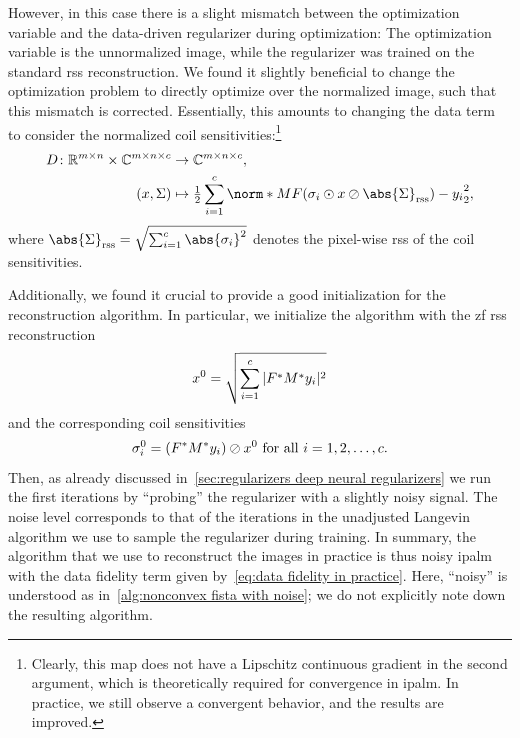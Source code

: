 However, in this case there is a slight mismatch between the optimization variable and the data-driven regularizer during optimization:
The optimization variable is the unnormalized image, while the regularizer was trained on the standard \gls{rss} reconstruction.
We found it slightly beneficial to change the optimization problem to directly optimize over the normalized image, such that this mismatch is corrected.
Essentially, this amounts to changing the data term to consider the normalized coil sensitivities:\footnote{%
	Clearly, this map does not have a Lipschitz continuous gradient in the second argument, which is theoretically required for convergence in \gls{ipalm}.
	In practice, we still observe a convergent behavior, and the results are improved.%
}
\begin{equation}
	\begin{aligned}
		\map{D}{\R^{m\times n}\times \C^{m\times n \times c}&}{\C^{m\times n \times c}},\\
		(x, \Sigma) &\mapsto \Half \sum_{i=\num{1}}^c \norm*{\Mask\Fourier(\sigma_i \odot x \oslash \abs{\Sigma}_{\mathrm{rss}}) - \Data_i}_{\num{2}}^{\num{2}},
	\end{aligned}
	\label{eq:data fidelity in practice}
\end{equation}
where \( \abs{\Sigma}_{\mathrm{rss}} = \sqrt{\sum_{i=\num{1}}^c \abs{\sigma_i}^{\num{2}}} \) denotes the pixel-wise \gls{rss} of the coil sensitivities.

Additionally, we found it crucial to provide a good initialization for the reconstruction algorithm.
In particular, we initialize the algorithm with the \gls{zf} \gls{rss} reconstruction
\begin{equation}
	x^{0} = \sqrt{\sum_{i=\num{1}}^c|F^{\ast}M^{\ast}y_i|^{\num{2}}}
	\label{eq:zero filled rss}
\end{equation}
and the corresponding coil sensitivities
\begin{equation}
	\sigma_i^{0} = (\Adjoint{\Fourier}\Adjoint{\Mask}\Data_i) \oslash x^{0}\ \text{for all \( i = 1,2, \dotsc, c \).}%
	\label{eq:initial guess}
\end{equation}
Then, as already discussed in~\cref{sec:regularizers deep neural regularizers} we run the first iterations by \enquote{probing} the regularizer with a slightly noisy signal.
The noise level corresponds to that of the iterations in the unadjusted Langevin algorithm we use to sample the regularizer during training.
In summary, the algorithm that we use to reconstruct the images in practice is thus noisy \gls{ipalm} with the data fidelity term given by~\cref{eq:data fidelity in practice}.
Here, \enquote{noisy} is understood as in~\cref{alg:nonconvex fista with noise};
we do not explicitly note down the resulting algorithm.
